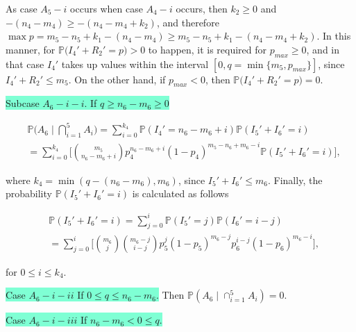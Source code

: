 \documentclass[a4paper]{article}
\theoremstyle{remark}
\begin{document}
As case $A_5-i$ occurs when case $A_4-i$ occurs, then $k_2\geq 0$ and $-(n_4-m_4)\geq-(n_4-m_4+k_2)$, and therefore  $\max{p}=m_5-n_5+k_1-(n_4-m_4)\geq m_5-n_5+k_1-(n_4-m_4+k_2)$. In this manner, for $\mathbb{P}\big(I_{4}'+R_{2}'=p\big)>0$ to happen, it is required for $p_{max}\geq 0$, and in that case $I_4'$ takes up values within the interval $[0,q=\min\{m_5, p_{max}\}]$, since $I_{4}'+R_{2}'\leq m_5$. On the other hand, if $p_{max}<0$, then $\mathbb{P}\big(I_{4}'+R_{2}'=p\big)=0$. %

\medskip
\colorbox{Aquamarine}{Subcase $A_6-i-i$. If $q\geq n_6-m_6\geq 0$}

\begin{equation*}
\begin{split}
&\mathbb{P}\bigg(A_{6}\mid \bigcap_{i=1}^{5}A_{i}\bigg)=\sum_{i=0}^{k_4} \mathbb{P}(I_{4}'=n_6-m_6+i)\mathbb{P}(I_{5}'+I_{6}'=i)\\
&=\sum_{i=0}^{k_4} \Bigg[{m_5 \choose n_6-m_6+i}p_4^{n_6-m_6+i}(1-p_4)^{m_5-n_6+m_6-i}\mathbb{P}(I_{5}'+I_{6}'=i)\Bigg],
\end{split}
\end{equation*}


where $k_4=\min(q-(n_6-m_6),m_6)$, since $I_{5}'+I_{6}'\leq m_6$. Finally, the probability $\mathbb{P}(I_{5}'+I_{6}'=i)$ is calculated as follows

\begin{equation*}
\begin{split}
&\mathbb{P}(I_{5}'+I_{6}'=i)=\sum_{j=0}^{i} \mathbb{P}(I_{5}'=j)\mathbb{P}(I_{6}'=i-j)\\
&=\sum_{j=0}^{i}\Bigg[{m_6 \choose j}{m_6-j \choose i-j}p_5^{j}(1-p_5)^{m_6-j}p_6^{i-j}(1-p_6)^{m_6-i}\Bigg],
\end{split}
\end{equation*}


for $0\leq i\leq k_4$. 

\medskip
\colorbox{Aquamarine}{Case $A_6-i-ii$ If $0 \leq q \leq n_6-m_6$.} Then $\mathbb{P}(A_{6}\mid \cap_{i=1}^{5}A_{i})=0$.

\medskip
\colorbox{Aquamarine}{Case $A_6-i-iii$ If $n_6-m_6 < 0 \leq q$.}
\end{document}
